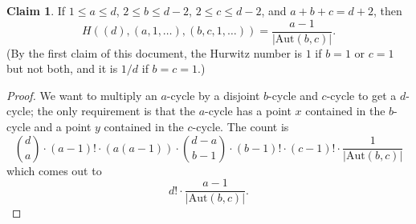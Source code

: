 \documentclass[11pt]{article}           %
\newcommand{\Aut}{\text{Aut}}
\theoremstyle{definition}
\newtheorem{claim}{Claim}[section]
\begin{document}
\begin{claim}
  If $1\leq a\leq d$, $2\leq b\leq d-2$, $2\leq c\leq d-2$, and $a+b+c=d+2$, then
  \[
  H((d),(a,1,\dots),(b,c,1,\dots))=\frac{a-1}{|\Aut(b,c)|}.
  \]
  (By the first claim of this document, the Hurwitz number is $1$ if $b=1$ or $c=1$ but not both, and it is $1/d$ if $b=c=1$.)
\end{claim}
\begin{proof}
  We want to multiply an $a$-cycle by a disjoint $b$-cycle and $c$-cycle to get a $d$-cycle; the only
  requirement is that the $a$-cycle has a point $x$ contained in the $b$-cycle and a point $y$ contained in the
  $c$-cycle.
  The count is
  \[
  \binom da\cdot (a-1)!\cdot (a(a-1))\cdot \binom{d-a}{b-1}\cdot (b-1)!\cdot (c-1)!\cdot \frac 1{|\Aut(b,c)|}
  \]
  which comes out to
  \[
  d!\cdot\frac{a-1}{|\Aut(b,c)|}.
  \]
  \end{proof}

\printbibliography
\end{document}

